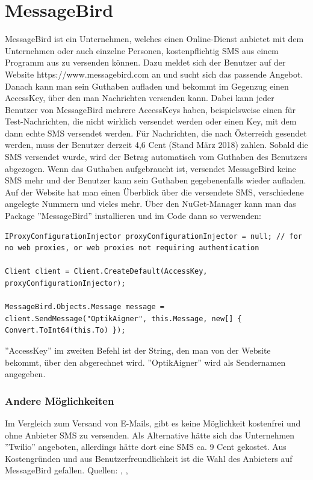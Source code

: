 \section{MessageBird}
MessageBird ist ein Unternehmen, welches einen Online-Dienst anbietet mit dem  Unternehmen oder auch einzelne Personen, kostenpflichtig SMS aus einem Programm aus zu versenden können. Dazu meldet sich der Benutzer auf der Website https://www.messagebird.com an und sucht sich das passende Angebot. Danach kann man sein Guthaben aufladen und bekommt im Gegenzug einen AccessKey, über den man Nachrichten versenden kann. Dabei kann jeder Benutzer von MessageBird mehrere AccessKeys haben, beispielsweise einen für Test-Nachrichten, die nicht wirklich versendet werden oder einen Key, mit dem dann echte SMS versendet werden. Für Nachrichten, die nach Österreich gesendet werden, muss der Benutzer derzeit 4,6 Cent (Stand März 2018) zahlen. Sobald die SMS versendet wurde, wird der Betrag automatisch vom Guthaben des Benutzers abgezogen. Wenn das Guthaben aufgebraucht ist, versendet MessageBird keine SMS mehr und der Benutzer kann sein Guthaben gegebenenfalls wieder aufladen. Auf der Website hat man einen Überblick über die versendete SMS, verschiedene angelegte Nummern und vieles mehr. Über den NuGet-Manager kann man das Package ''MessageBird'' installieren und im Code dann so verwenden:
\begin{lstlisting}
IProxyConfigurationInjector proxyConfigurationInjector = null; // for no web proxies, or web proxies not requiring authentication

Client client = Client.CreateDefault(AccessKey, proxyConfigurationInjector);

MessageBird.Objects.Message message = client.SendMessage("OptikAigner", this.Message, new[] { Convert.ToInt64(this.To) });
\end{lstlisting}

''AccessKey'' im zweiten Befehl ist der String, den man von der Website bekommt, über den abgerechnet wird. ''OptikAigner'' wird als Sendernamen angegeben.

\subsubsection{Andere Möglichkeiten}
Im Vergleich zum Versand von E-Mails, gibt es keine Möglichkeit kostenfrei und ohne Anbieter SMS zu versenden. Als Alternative hätte sich das Unternehmen ''Twilio'' angeboten, allerdings hätte dort eine SMS ca. 9 Cent gekostet. Aus Kostengründen und aus Benutzerfreundlichkeit ist die Wahl des Anbieters auf MessageBird gefallen.
\newline Quellen: \cite{messagebird_sms_2018}, \cite{messagebird_preise_2018}, \cite{twilio_sms_2018}